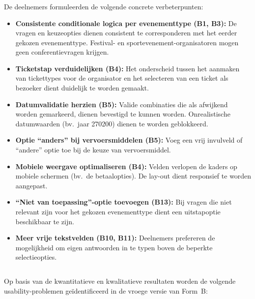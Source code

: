 \subsubsection{}

De deelnemers formuleerden de volgende concrete verbeterpunten:

\begin{itemize}
  \item \textbf{Consistente conditionale logica per evenementtype (B1, B3):} De vragen en keuzeopties dienen consistent te corresponderen met het eerder gekozen evenementtype. Festival- en sportevenement-organisatoren mogen geen conferentievragen krijgen.
  \item \textbf{Ticketstap verduidelijken (B4):} Het onderscheid tussen het aanmaken van tickettypes voor de organisator en het selecteren van een ticket als bezoeker dient duidelijk te worden gemaakt.
  \item \textbf{Datumvalidatie herzien (B5):} Valide combinaties die als afwijkend worden gemarkeerd, dienen bevestigd te kunnen worden. Onrealistische datumwaarden (bv.\ jaar 270200) dienen te worden geblokkeerd.
  \item \textbf{Optie ``anders'' bij vervoersmiddelen (B5):} Voeg een vrij invulveld of ``andere'' optie toe bij de keuze van vervoersmiddel.
  \item \textbf{Mobiele weergave optimaliseren (B4):} Velden verlopen de kaders op mobiele schermen (bv.\ de betaalopties). De lay-out dient responsief te worden aangepast.
  \item \textbf{``Niet van toepassing''-optie toevoegen (B13):} Bij vragen die niet relevant zijn voor het gekozen evenementtype dient een uitstapoptie beschikbaar te zijn.
  \item \textbf{Meer vrije tekstvelden (B10, B11):} Deelnemers prefereren de mogelijkheid om eigen antwoorden in te typen boven de beperkte selectieopties.
\end{itemize}

\subsection{}

Op basis van de kwantitatieve en kwalitatieve resultaten worden de volgende usability-problemen geïdentificeerd in de vroege versie van Form~B:

